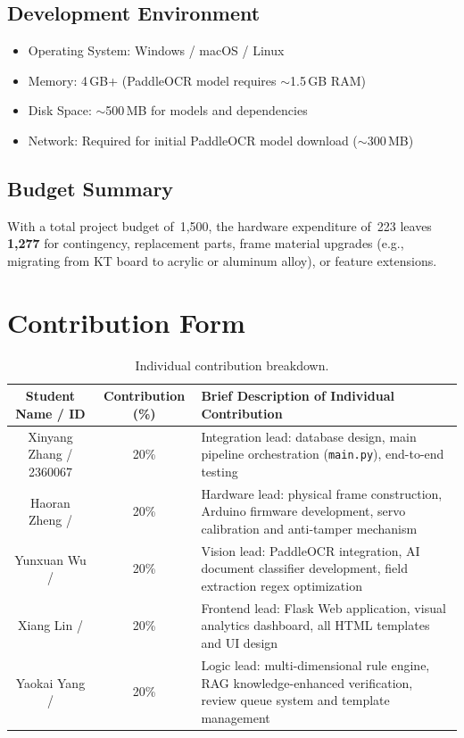 \documentclass[conference]{IEEEtran}
\begin{document}
\subsection{Development Environment}

\begin{itemize}[leftmargin=*]
    \item Operating System: Windows / macOS / Linux
    \item Memory: 4\,GB+ (PaddleOCR model requires $\sim$1.5\,GB RAM)
    \item Disk Space: $\sim$500\,MB for models and dependencies
    \item Network: Required for initial PaddleOCR model download ($\sim$300\,MB)
\end{itemize}

\subsection{Budget Summary}

With a total project budget of \textyen\,1,500, the hardware expenditure of \textyen\,223 leaves \textbf{\textyen\,1,277} for contingency, replacement parts, frame material upgrades (e.g., migrating from KT board to acrylic or aluminum alloy), or feature extensions.

\section*{Contribution Form}

\begin{table}[H]
    \centering
    \caption{Individual contribution breakdown.}
    \label{tab:contribution}
    \begin{tabular}{|c|c|p{7cm}|}
        \hline
        \textbf{Student Name / ID} & \textbf{Contribution (\%)} & \textbf{Brief Description of Individual Contribution} \\
        \hline
        Xinyang Zhang / 2360067 & 20\% & Integration lead: database design, main pipeline orchestration (\texttt{main.py}), end-to-end testing \\
        \hline
        Haoran Zheng / & 20\% & Hardware lead: physical frame construction, Arduino firmware development, servo calibration and anti-tamper mechanism \\
        \hline
        Yunxuan Wu / & 20\% & Vision lead: PaddleOCR integration, AI document classifier development, field extraction regex optimization \\
        \hline
        Xiang Lin / & 20\% & Frontend lead: Flask Web application, visual analytics dashboard, all HTML templates and UI design \\
        \hline
        Yaokai Yang / & 20\% & Logic lead: multi-dimensional rule engine, RAG knowledge-enhanced verification, review queue system and template management \\
        \hline
    \end{tabular}
\end{table}
\end{document}
